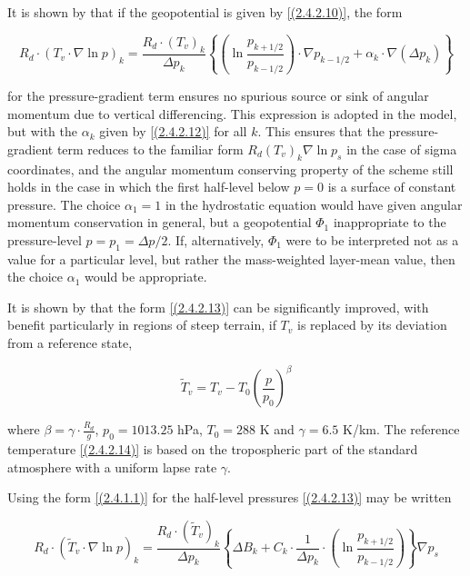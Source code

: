 It is shown by \cite{simmons81b} that if the geopotential is given by
\ref{(2.4.2.10)}, the form

\begin{equation}
R_d\cdot (T_v\cdot\nabla\ln p)_k = \frac{R_d\cdot (T_v)_k}
{\Delta p_k}\left\{\left(\ln{\frac{p_{k+1/2}}{p_{k-1/2}}}\right)
\cdot \nabla p_{k-1/2} + \alpha_k\cdot\nabla(\Delta p_k)\right\}
\label{(2.4.2.13)}
\end{equation}

for the pressure-gradient term ensures no spurious source or sink of
angular momentum due to vertical differencing. This expression is
adopted in the model, but with the $\alpha_k$ given by
\ref{(2.4.2.12)} for all $k$. This ensures that the pressure-gradient
term reduces to the familiar form $R_d(T_v)_k\nabla\ln p_s$ in the
case of sigma coordinates, and the angular momentum conserving
property of the scheme still holds in the case in which the first
half-level below $p = 0$ is a surface of constant pressure. The choice
$\alpha_1 = 1$ in the hydrostatic equation would have given angular
momentum conservation in general, but a geopotential $\Phi_1$
inappropriate to the pressure-level $p = p_1 = \Delta p/2$. If,
alternatively, $\Phi_1$ were to be interpreted not as a value for a
particular level, but rather the mass-weighted layer-mean value, then
the choice $\alpha_1$ would be appropriate.

It is shown by \cite{simmons91} that the form \ref{(2.4.2.13)} can be
significantly improved, with benefit particularly in regions of steep
terrain, if $T_v$ is replaced by its deviation from a reference state,

\begin{equation}
\tilde{T}_v = T_v - T_0 \left(\frac{p}{p_0}\right)^{\beta}
\label{(2.4.2.14)}
\end{equation}

where $\beta = \gamma \cdot \frac{R_d}{g}$, $p_0 = 1013.25$ hPa, $T_0
= 288$ K and $\gamma = 6.5$ K/km. The reference temperature
\ref{(2.4.2.14)} is based on the tropospheric part of the
\cite{icao64} standard atmosphere with a uniform lapse rate $\gamma$.

Using the form \ref{(2.4.1.1)} for the half-level pressures
\ref{(2.4.2.13)} may be written

\begin{equation}
R_d\cdot (\tilde{T}_v\cdot\nabla\ln p)_k = \frac{R_d\cdot (\tilde{T}_v)_k}
{\Delta p_k}\left\{\Delta B_k + C_k \cdot \frac{1}{\Delta p_k}
\cdot \left(\ln{\frac{p_{k+1/2}}{p_{k-1/2}}}\right)\right\} \nabla p_s
\label{(2.4.2.15)}
\end{equation}

